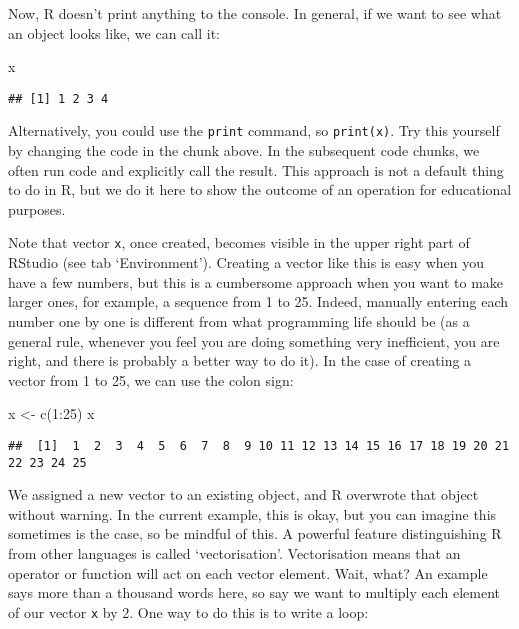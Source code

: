 \documentclass[
]{article}
\newenvironment{Shaded}{\begin{snugshade}}{\end{snugshade}}
\newcommand{\DecValTok}[1]{\textcolor[rgb]{0.00,0.00,0.81}{#1}}
\newcommand{\FunctionTok}[1]{\textcolor[rgb]{0.00,0.00,0.00}{#1}}
\newcommand{\NormalTok}[1]{#1}
\newcommand{\OtherTok}[1]{\textcolor[rgb]{0.56,0.35,0.01}{#1}}
\newcommand{\SpecialCharTok}[1]{\textcolor[rgb]{0.00,0.00,0.00}{#1}}
\begin{document}
Now, R doesn't print anything to the console. In general, if we want to
see what an object looks like, we can call it:

\begin{Shaded}
\begin{Highlighting}[]
\NormalTok{x}
\end{Highlighting}
\end{Shaded}

\begin{verbatim}
## [1] 1 2 3 4
\end{verbatim}

Alternatively, you could use the \texttt{print} command, so
\texttt{print(x)}. Try this yourself by changing the code in the chunk
above. In the subsequent code chunks, we often run code and explicitly
call the result. This approach is not a default thing to do in R, but we
do it here to show the outcome of an operation for educational purposes.

Note that vector \texttt{x}, once created, becomes visible in the upper
right part of RStudio (see tab `Environment'). Creating a vector like
this is easy when you have a few numbers, but this is a cumbersome
approach when you want to make larger ones, for example, a sequence from
1 to 25. Indeed, manually entering each number one by one is different
from what programming life should be (as a general rule, whenever you
feel you are doing something very inefficient, you are right, and there
is probably a better way to do it). In the case of creating a vector
from 1 to 25, we can use the colon sign:

\begin{Shaded}
\begin{Highlighting}[]
\NormalTok{x }\OtherTok{\textless{}{-}} \FunctionTok{c}\NormalTok{(}\DecValTok{1}\SpecialCharTok{:}\DecValTok{25}\NormalTok{)}
\NormalTok{x}
\end{Highlighting}
\end{Shaded}

\begin{verbatim}
##  [1]  1  2  3  4  5  6  7  8  9 10 11 12 13 14 15 16 17 18 19 20 21 22 23 24 25
\end{verbatim}

We assigned a new vector to an existing object, and R overwrote that
object without warning. In the current example, this is okay, but you
can imagine this sometimes is the case, so be mindful of this. A
powerful feature distinguishing R from other languages is called
`vectorisation'. Vectorisation means that an operator or function will
act on each vector element. Wait, what? An example says more than a
thousand words here, so say we want to multiply each element of our
vector \texttt{x} by 2. One way to do this is to write a loop:
\end{document}
